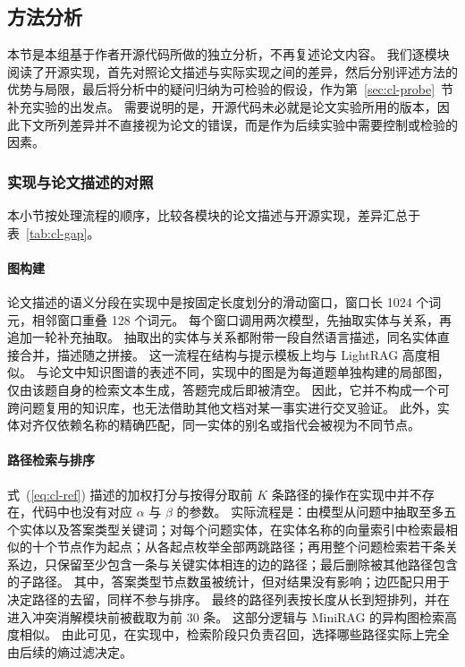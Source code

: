 \subsection{方法分析}
\label{sec:cl-method}

本节是本组基于作者开源代码所做的独立分析，不再复述论文内容。
我们逐模块阅读了开源实现，首先对照论文描述与实际实现之间的差异，然后分别评述方法的优势与局限，最后将分析中的疑问归纳为可检验的假设，作为第~\ref{sec:cl-probe}~节补充实验的出发点。
需要说明的是，开源代码未必就是论文实验所用的版本，因此下文所列差异并不直接视为论文的错误，而是作为后续实验中需要控制或检验的因素。

\subsubsection{实现与论文描述的对照}
\label{sec:cl-gap}

本小节按处理流程的顺序，比较各模块的论文描述与开源实现，差异汇总于表~\ref{tab:cl-gap}。

\paragraph{图构建}
论文描述的语义分段在实现中是按固定长度划分的滑动窗口，窗口长 1024 个词元，相邻窗口重叠 128 个词元。
每个窗口调用两次模型，先抽取实体与关系，再追加一轮补充抽取。
抽取出的实体与关系都附带一段自然语言描述，同名实体直接合并，描述随之拼接。
这一流程在结构与提示模板上均与 LightRAG 高度相似。
与论文中知识图谱的表述不同，实现中的图是为每道题单独构建的局部图，仅由该题自身的检索文本生成，答题完成后即被清空。
因此，它并不构成一个可跨问题复用的知识库，也无法借助其他文档对某一事实进行交叉验证。
此外，实体对齐仅依赖名称的精确匹配，同一实体的别名或指代会被视为不同节点。

\paragraph{路径检索与排序}
式~(\ref{eq:cl-ref}) 描述的加权打分与按得分取前 $K$ 条路径的操作在实现中并不存在，代码中也没有对应 $\alpha$ 与 $\beta$ 的参数。
实际流程是：由模型从问题中抽取至多五个实体以及答案类型关键词；对每个问题实体，在实体名称的向量索引中检索最相似的十个节点作为起点；从各起点枚举全部两跳路径；再用整个问题检索若干条关系边，只保留至少包含一条与关键实体相连的边的路径；最后删除被其他路径包含的子路径。
其中，答案类型节点数虽被统计，但对结果没有影响；边匹配只用于决定路径的去留，同样不参与排序。
最终的路径列表按长度从长到短排列，并在进入冲突消解模块前被截取为前 30 条。
这部分逻辑与 MiniRAG 的异构图检索高度相似。
由此可见，在实现中，检索阶段只负责召回，选择哪些路径实际上完全由后续的熵过滤决定。

